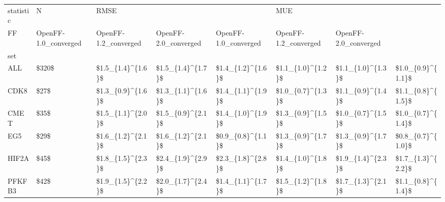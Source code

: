 \begin{tabular}{llllllll}
\toprule
statistic &      N & \multicolumn{3}{l}{RMSE} & \multicolumn{3}{l}{MUE} \\
FF & OpenFF-1.0\_converged & OpenFF-1.2\_converged & OpenFF-2.0\_converged & OpenFF-1.0\_converged & OpenFF-1.2\_converged & OpenFF-2.0\_converged \\
set    &        &                      &                      &                      &                      &                      &                      \\
\midrule
ALL    &  \$320\$ &    \$1.5\_\{1.4\}\textasciicircum \{1.6\}\$ &    \$1.5\_\{1.4\}\textasciicircum \{1.7\}\$ &    \$1.4\_\{1.2\}\textasciicircum \{1.6\}\$ &    \$1.1\_\{1.0\}\textasciicircum \{1.2\}\$ &    \$1.1\_\{1.0\}\textasciicircum \{1.3\}\$ &    \$1.0\_\{0.9\}\textasciicircum \{1.1\}\$ \\
CDK8   &   \$27\$ &    \$1.3\_\{0.9\}\textasciicircum \{1.6\}\$ &    \$1.3\_\{1.1\}\textasciicircum \{1.6\}\$ &    \$1.4\_\{1.1\}\textasciicircum \{1.9\}\$ &    \$1.0\_\{0.7\}\textasciicircum \{1.3\}\$ &    \$1.1\_\{0.9\}\textasciicircum \{1.4\}\$ &    \$1.1\_\{0.8\}\textasciicircum \{1.5\}\$ \\
CMET   &   \$35\$ &    \$1.5\_\{1.1\}\textasciicircum \{2.0\}\$ &    \$1.5\_\{0.9\}\textasciicircum \{2.1\}\$ &    \$1.4\_\{1.0\}\textasciicircum \{1.9\}\$ &    \$1.3\_\{0.9\}\textasciicircum \{1.5\}\$ &    \$1.0\_\{0.7\}\textasciicircum \{1.5\}\$ &    \$1.0\_\{0.7\}\textasciicircum \{1.4\}\$ \\
EG5    &   \$29\$ &    \$1.6\_\{1.2\}\textasciicircum \{2.1\}\$ &    \$1.6\_\{1.2\}\textasciicircum \{2.1\}\$ &    \$0.9\_\{0.8\}\textasciicircum \{1.1\}\$ &    \$1.3\_\{0.9\}\textasciicircum \{1.7\}\$ &    \$1.3\_\{0.9\}\textasciicircum \{1.7\}\$ &    \$0.8\_\{0.7\}\textasciicircum \{1.0\}\$ \\
HIF2A  &   \$45\$ &    \$1.8\_\{1.5\}\textasciicircum \{2.3\}\$ &    \$2.4\_\{1.9\}\textasciicircum \{2.9\}\$ &    \$2.3\_\{1.8\}\textasciicircum \{2.8\}\$ &    \$1.4\_\{1.0\}\textasciicircum \{1.8\}\$ &    \$1.9\_\{1.4\}\textasciicircum \{2.3\}\$ &    \$1.7\_\{1.3\}\textasciicircum \{2.2\}\$ \\
PFKFB3 &   \$42\$ &    \$1.9\_\{1.5\}\textasciicircum \{2.2\}\$ &    \$2.0\_\{1.7\}\textasciicircum \{2.4\}\$ &    \$1.4\_\{1.1\}\textasciicircum \{1.7\}\$ &    \$1.5\_\{1.2\}\textasciicircum \{1.8\}\$ &    \$1.7\_\{1.3\}\textasciicircum \{2.1\}\$ &    \$1.1\_\{0.8\}\textasciicircum \{1.4\}\$ \\

\end{tabular}
